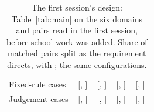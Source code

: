 \begin{table}[t]
\begin{tabular}{lcccc}
Fixed-rule cases & \FirstSessionSideBySideReasoningFixedRule{}\,{\scriptsize[\FirstSessionSideBySideReasoningFixedRuleLo{}, \FirstSessionSideBySideReasoningFixedRuleHi{}]} & \FirstSessionAloneReasoningFixedRule{}\,{\scriptsize[\FirstSessionAloneReasoningFixedRuleLo{}, \FirstSessionAloneReasoningFixedRuleHi{}]} & \FirstSessionToldPrincipleReasoningFixedRule{}\,{\scriptsize[\FirstSessionToldPrincipleReasoningFixedRuleLo{}, \FirstSessionToldPrincipleReasoningFixedRuleHi{}]} & \FirstSessionToldRuleReasoningFixedRule{}\,{\scriptsize[\FirstSessionToldRuleReasoningFixedRuleLo{}, \FirstSessionToldRuleReasoningFixedRuleHi{}]} \\
Judgement cases & \FirstSessionSideBySideReasoningJudgement{}\,{\scriptsize[\FirstSessionSideBySideReasoningJudgementLo{}, \FirstSessionSideBySideReasoningJudgementHi{}]} & \FirstSessionAloneReasoningJudgement{}\,{\scriptsize[\FirstSessionAloneReasoningJudgementLo{}, \FirstSessionAloneReasoningJudgementHi{}]} & \FirstSessionToldPrincipleReasoningJudgement{}\,{\scriptsize[\FirstSessionToldPrincipleReasoningJudgementLo{}, \FirstSessionToldPrincipleReasoningJudgementHi{}]} & \FirstSessionToldRuleReasoningJudgement{}\,{\scriptsize[\FirstSessionToldRuleReasoningJudgementLo{}, \FirstSessionToldRuleReasoningJudgementHi{}]} \\
\bottomrule
\end{tabular}
\caption{The first session's design: Table~\ref{tab:main} on the six domains and \FirstSessionNumPairs{} pairs read in the first session, before school work was added. Share of matched pairs split as the requirement directs, with \IntervalsNote{}; the same \NumConfigurations{} configurations.}
\label{tab:first-session}
\end{table}
